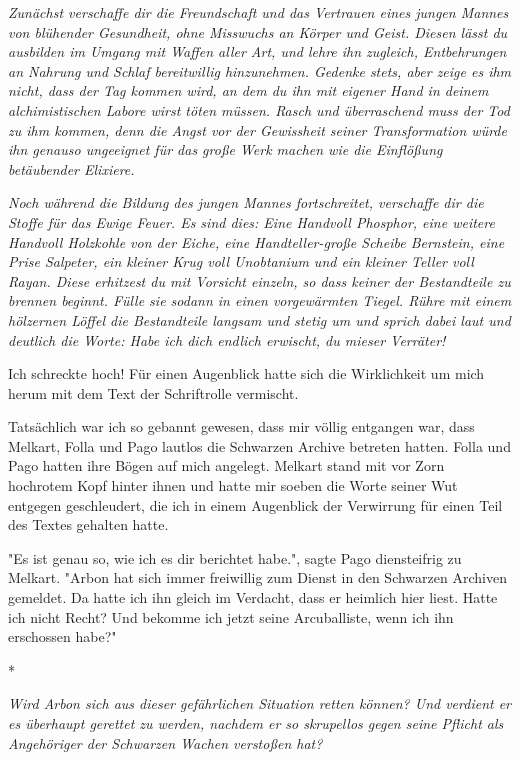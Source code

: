 \documentclass[10pt, a4paper, oneside]{book}
\begin{document}
\begin{multicols}{2}
\textit{Zunächst verschaffe dir die Freundschaft und das Vertrauen eines jungen Mannes von blühender Gesundheit, ohne Misswuchs an Körper und Geist. Diesen lässt du ausbilden im Umgang mit Waffen aller Art, und lehre ihn zugleich, Entbehrungen an Nahrung und Schlaf bereitwillig hinzunehmen. Gedenke stets, aber zeige es ihm nicht, dass der Tag kommen wird, an dem du ihn mit eigener Hand in deinem alchimistischen Labore wirst töten müssen. Rasch und überraschend muss der Tod zu ihm kommen, denn die Angst vor der Gewissheit seiner Transformation würde ihn genauso ungeeignet für das große Werk machen wie die Einflößung betäubender Elixiere.}

\textit{Noch während die Bildung des jungen Mannes fortschreitet, verschaffe dir die Stoffe für das Ewige Feuer. Es sind dies: Eine Handvoll Phosphor, eine weitere Handvoll Holzkohle von der Eiche, eine Handteller-große Scheibe Bernstein, eine Prise Salpeter, ein kleiner Krug voll Unobtanium und ein kleiner Teller voll Rayan. Diese erhitzest du mit Vorsicht einzeln, so dass keiner der Bestandteile zu brennen beginnt. Fülle sie sodann in einen vorgewärmten Tiegel. Rühre mit einem hölzernen Löffel die Bestandteile langsam und stetig um und sprich dabei laut und deutlich die Worte: Habe ich dich endlich erwischt, du mieser Verräter!}

Ich schreckte hoch! Für einen Augenblick hatte sich die Wirklichkeit um mich herum mit dem Text der Schriftrolle vermischt.

Tatsächlich war ich so gebannt gewesen, dass mir völlig entgangen war, dass Melkart, Folla und Pago lautlos die Schwarzen Archive betreten hatten. Folla und Pago hatten ihre Bögen auf mich angelegt. Melkart stand mit vor Zorn hochrotem Kopf hinter ihnen und hatte mir soeben die Worte seiner Wut entgegen geschleudert, die ich in einem Augenblick der Verwirrung für einen Teil des Textes gehalten hatte.

"Es ist genau so, wie ich es dir berichtet habe.", sagte Pago diensteifrig zu Melkart. "Arbon hat sich immer freiwillig zum Dienst in den Schwarzen Archiven gemeldet. Da hatte ich ihn gleich im Verdacht, dass er heimlich hier liest. Hatte ich nicht Recht? Und bekomme ich jetzt seine Arcuballiste, wenn ich ihn erschossen habe?"

\begin{center}
    *
\end{center}

\textit{Wird Arbon sich aus dieser gefährlichen Situation retten können? Und verdient er es überhaupt gerettet zu werden, nachdem er so skrupellos gegen seine Pflicht als Angehöriger der Schwarzen Wachen verstoßen hat?}


\end{multicols}
\end{document}
